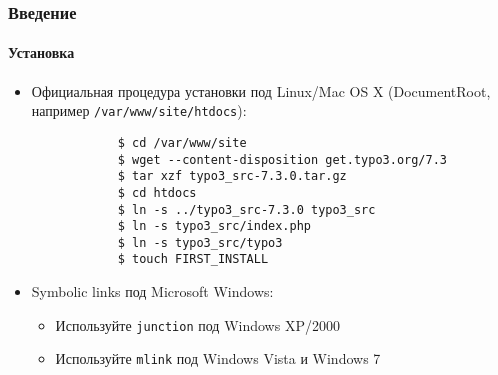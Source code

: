 \begin{frame}[fragile]
	\frametitle{Введение}
	\framesubtitle{Установка}

	\begin{itemize}
		\item Официальная процедура установки под Linux/Mac OS X\newline
			(DocumentRoot, например \texttt{/var/www/site/htdocs}):
		\begin{lstlisting}
			$ cd /var/www/site
			$ wget --content-disposition get.typo3.org/7.3
			$ tar xzf typo3_src-7.3.0.tar.gz
			$ cd htdocs
			$ ln -s ../typo3_src-7.3.0 typo3_src
			$ ln -s typo3_src/index.php
			$ ln -s typo3_src/typo3
			$ touch FIRST_INSTALL
		\end{lstlisting}

		\item Symbolic links под Microsoft Windows:

			\begin{itemize}
				\item Используйте \texttt{junction} под Windows XP/2000
				\item Используйте \texttt{mlink} под Windows Vista и Windows 7
			\end{itemize}

	\end{itemize}
\end{frame}

